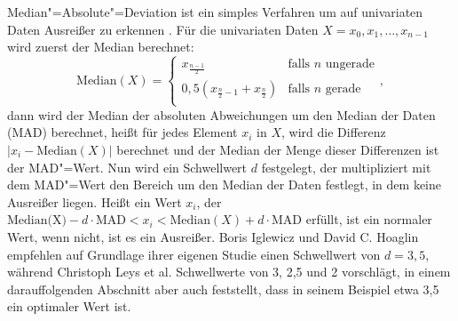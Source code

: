 Median"=Absolute"=Deviation ist ein simples Verfahren um auf univariaten Daten Ausreißer zu erkennen \cite[Ch. 3.3]{mad}. Für die univariaten Daten $X=x_0,x_1,\ldots, x_{n-1}$ wird zuerst der Median berechnet: \[\text{Median}(X)=\left\{ \begin{array}{ll}
    x_{\frac{n-1}{2}} & \text{falls } n \text{ ungerade} \\
    0,5 (x_{\frac{n}{2}-1} + x_{\frac{n}{2}}) & \text{falls } n \text{ gerade} \\
\end{array} \right.,\] dann wird der Median der absoluten Abweichungen um den Median der Daten (MAD) berechnet, heißt für jedes Element $x_i$ in $X$, wird die Differenz $|x_i - \text{Median}(X)|$ berechnet und der Median der Menge dieser Differenzen ist der MAD"=Wert. Nun wird ein Schwellwert $d$ festgelegt, der multipliziert mit dem MAD"=Wert den Bereich um den Median der Daten festlegt, in dem keine Ausreißer liegen. Heißt ein Wert $x_i$, der $\text{Median(X)} - d \cdot \text{MAD} < x_i < \text{Median}(X) + d \cdot \text{MAD}$ erfüllt, ist ein normaler Wert, wenn nicht, ist es ein Ausreißer. Boris Iglewicz und David C. Hoaglin \cite[Ch. 3.3]{mad} empfehlen auf Grundlage ihrer eigenen Studie einen Schwellwert von $d=3,5$, während Christoph Leys et al. \cite[p. 766]{mad2} Schwellwerte von 3, 2,5 und 2 vorschlägt, in einem darauffolgenden Abschnitt aber auch feststellt, dass in seinem Beispiel etwa 3,5 ein optimaler Wert ist. 
